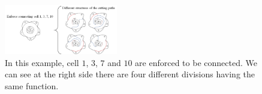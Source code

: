 \documentclass[conference]{IEEEtran}
\begin{document}

\begin{figure}[t]
\centering
\includegraphics[width = 0.44\textwidth]{figures/proof/fig_only_one_division_2}
\caption{In this example, cell $1$, $3$, $7$ and $10$ are enforced to be connected. 
We can see at the right side there are four different divisions having the same function. 
}\label{fig_not_same_cutting_path}
\end{figure}
\end{document}

